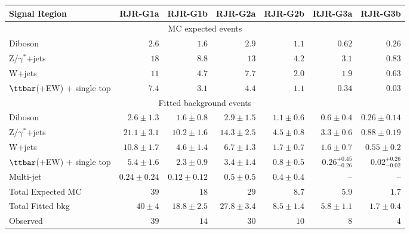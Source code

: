 \begin{table}[H]
\begin{center}
\begin{tabular}{|lrrrrrr|}
\hline
Signal Region & \textbf{ RJR-G1a } & \textbf{ RJR-G1b } & \textbf{ RJR-G2a } & \textbf{ RJR-G2b } & \textbf{ RJR-G3a } & \textbf{ RJR-G3b } \\
\hline
\multicolumn{7}{|c|}{MC expected events} \\ \hline
Diboson &  $2.6$               &  $1.6$               &  $2.9$               &  $1.1$               &  $0.62$               &  $0.26$               \\
$\mathrm{Z/\gamma^{*}}$+jets &  $18$               &  $8.8$               &  $13$               &  $4.2$               &  $3.1$               &  $0.83$               \\
W+jets &  $11$               &  $4.7$               &  $7.7$               &  $2.0$               &  $1.9$               &  $0.63$               \\
$\ttbar$(+EW) + single top &  $7.4$               &  $3.1$               &  $4.4$               &  $1.1$               &  $0.34$               &  $0.03$               \\
\hline
\multicolumn{7}{|c|}{Fitted background events} \\ \hline
Diboson & $2.6 \pm 1.3$ & $1.6 \pm 0.8$ & $2.9 \pm 1.5$ & $1.1 \pm 0.6$ & $0.6 \pm 0.4$ & $0.26 \pm 0.14$ \\
$\mathrm{Z/\gamma^{*}}$+jets & $21.1 \pm 3.1$ & $10.2 \pm 1.6$ & $14.3 \pm 2.5$ & $4.5 \pm 0.8$ & $3.3 \pm 0.6$ & $0.88 \pm 0.19$ \\
W+jets & $10.8 \pm 1.7$ & $4.6 \pm 1.4$ & $6.7 \pm 1.3$ & $1.7 \pm 0.7$ & $1.6 \pm 0.7$ & $0.55 \pm 0.2$ \\
$\ttbar$(+EW) + single top & $5.4 \pm 1.6$ & $2.3 \pm 0.9$ & $3.4 \pm 1.4$ & $0.8 \pm 0.5$ &  $0.26_{-0.26}^{+0.45}$               &  $0.02_{-0.02}^{+0.26}$               \\
Multi-jet & $0.24 \pm 0.24$ & $0.12 \pm 0.12$ & $0.5 \pm 0.5$ & $0.4 \pm 0.4$ & -- & -- \\
\hline
Total Expected MC &  $39$               &  $18$               &  $29$               &  $8.7$               &  $5.9$               &  $1.7$               \\
\hline
Total Fitted bkg & $40 \pm 4$ & $18.8 \pm 2.5$ & $27.8 \pm 3.4$ & $8.5 \pm 1.4$ & $5.8 \pm 1.1$ & $1.7 \pm 0.4$ \\
\hline
Observed &  $39$                     &  $14$                     &  $30$                     &  $10$                     &  $8$                     &  $4$                     \\
\hline



\end{tabular}
\end{center}
\end{table}
